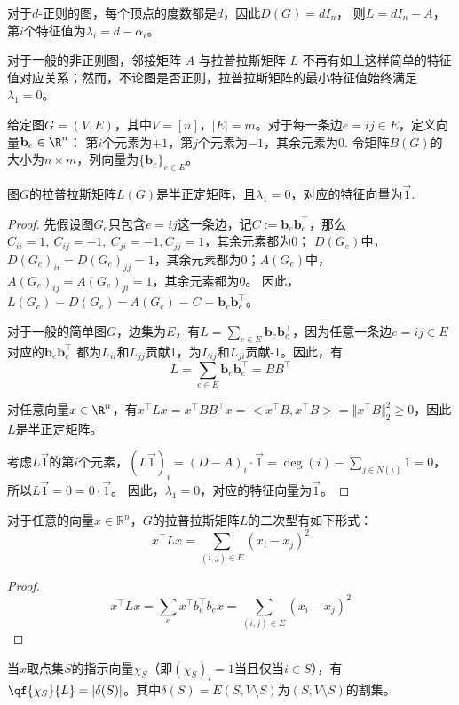 \documentclass[lang=cn,newtx,10pt,scheme=chinese,chinesefont=nofont,citestyle=gb7714-2015, bibstyle=gb7714-2015]{elegantbook}
\providecommand{\rspace}[1]{\mathbb{R}^{#1}}
\providecommand{\abs}[1]{\lvert#1\rvert}
\begin{document}
\begin{refsection}
\example 对于$d$-正则的图，每个顶点的度数都是$d$，因此$D(G)=dI_n$，
则$L=dI_n-A$，第$i$个特征值为$\lambda_i=d-\alpha_i$。

对于一般的非正则图，邻接矩阵 $A$ 与拉普拉斯矩阵 $L$ 不再有如上这样简单的特征值对应关系；然而，不论图是否正则，拉普拉斯矩阵的最小特征值始终满足 $\lambda_1=0$。

\begin{definition}\label{def:incidence}
    给定图$G=(V,E)$，其中$V=[n]$，$|E|=m$。对于每一条边$e=ij\in E$，定义向量$\mathbf{b}_e\in\R^n$：
    第$i$个元素为$+1$，第$j$个元素为$-1$，其余元素为0.
    令矩阵$B(G)$的大小为$n\times m$，列向量为$\{\mathbf{b}_e\}_{e\in E}$。
\end{definition}

\begin{lemma}
    图$G$的拉普拉斯矩阵$L(G)$是半正定矩阵，且$\lambda_1=0$，对应的特征向量为$\vec{1}$.
\end{lemma}

\begin{proof}
    先假设图$G_e$只包含$e=ij$这一条边，记$C:=\mathbf{b}_e \mathbf{b}_e^\top$，那么$C_{ii}=1,\ C_{ij}=-1,\ C_{ji}=-1, C_{jj}=1$，其余元素都为0；
    $D(G_e)$中，$D(G_e)_{ii}=D(G_e)_{jj}=1$，其余元素都为0；$A(G_e)$中，$A(G_e)_{ij}=A(G_e)_{ji}=1$，其余元素都为0。
    因此，$L(G_e)=D(G_e)-A(G_e)=C=\mathbf{b}_e \mathbf{b}_e^\top$。

    对于一般的简单图$G$，边集为$E$，有$L=\sum_{e\in E}\mathbf{b}_e \mathbf{b}_e^\top$，因为任意一条边$e=ij\in E$对应的$\mathbf{b}_e \mathbf{b}_e^\top$
    都为$L_{ii}$和$L_{jj}$贡献1，为$L_{ij}$和$L_{ji}$贡献-1。因此，有
    \[
    L=\sum_{e\in E}\mathbf{b}_e \mathbf{b}_e^\top=BB^\top
    \]

    对任意向量$x\in \R^n$，有$x^\top Lx=x^\top BB^\top x=<x^\top B,x^\top B>=\Vert x^\top B\Vert_2^2\ge0$，因此$L$是半正定矩阵。

    考虑$L\vec{1}$的第$i$个元素，$(L\vec{1})_i=(D-A)_i\cdot\vec{1}=\deg(i)-\sum_{j\in N(i)}1=0$，所以$L\vec{1}=0=0\cdot\vec{1}$。
    因此，$\lambda_1=0$，对应的特征向量为$\vec{1}$。
\end{proof}

\begin{lemma}[拉普拉斯矩阵的二次型]
\label{lem:laplace_quardratic_form}
    对于任意的向量$x\in\rspace{n}$，$G$的拉普拉斯矩阵$L$的二次型有如下形式：
    \[x^{\top}Lx=\sum_{(i,j)\in E}(x_i-x_j)^2\]
\end{lemma}
\begin{proof}
    \[x^{\top}Lx=\sum_{e}x^{\top}b_e^{\top}b_ex=\sum_{(i,j)\in E}(x_i-x_j)^2\]
\end{proof}
当$x$取点集$S$的指示向量$\chi_S$（即$(\chi_S)_i=1$当且仅当$i\in S$），有$\qf{\chi_S}{L}=\abs{\delta(S)}$。其中$\delta(S)=E(S,V\setminus S)$为$(S,V\setminus S)$的割集。


\end{refsection}
\end{document}
